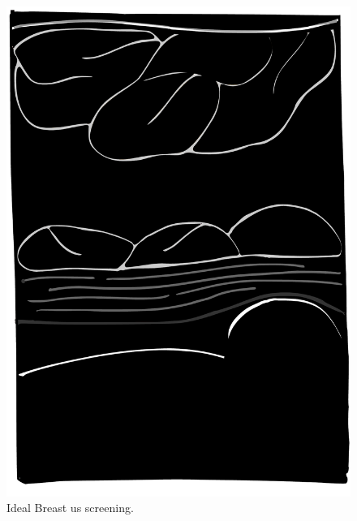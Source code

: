 \begin{frame}
\begin{columns}
\begin{column}{.48\textwidth}
\begin{overprint}
      \begin{figure}\centering
        \includegraphics[width=.75\textwidth]{US.pdf}
        \caption{Ideal Breast \ac{us} screening.}
      \end{figure}	
    \end{overprint}
  \end{column}

\end{columns}
\end{frame}


